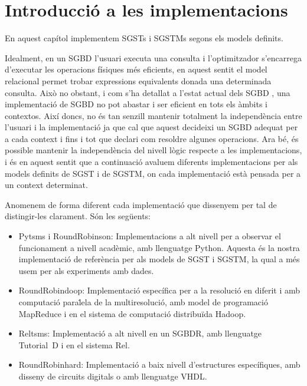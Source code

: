 

\chapter{Introducció a les implementacions}

En aquest capítol implementem \glspl{SGST} i \glspl{SGSTM} segons els
models definits.



Idealment, en un \gls{SGBD} l'usuari executa una consulta i
l'optimitzador s'encarrega d'executar les operacions físiques més
eficients, en aquest sentit el model relacional permet trobar
expressions equivalents donada una determinada consulta. Això no
obstant, i com s'ha detallat a l'estat actual dels \gls{SGBD}
, una implementació de \gls{SGBD} no pot abastar i ser
eficient en tots els àmbits i contextos. Així doncs, no és tan senzill
mantenir totalment la independència entre l'usuari i la implementació
ja que cal que aquest decideixi un \gls{SGBD} adequat per a cada
context i fins i tot que declari com resoldre algunes operacions.  Ara
bé, és possible mantenir la independència del nivell lògic respecte a
les implementacions, i és en aquest sentit que a continuació avaluem
diferents implementacions per als models definits de \gls{SGST} i de
\gls{SGSTM}, on cada implementació està pensada per a un context
determinat.


Anomenem de forma diferent cada implementació que dissenyem per tal de
distingir-les clarament. Són les següents:

\begin{itemize}
\item Pytsms i RoundRobinson: Implementacions a alt nivell per a
  observar el funcionament a nivell acadèmic, amb llenguatge
  Python. Aquesta és la nostra implementació de referència per als
  models de \gls{SGST} i \gls{SGSTM}, la qual a més usem per als
  experiments amb dades.

\item RoundRobindoop: Implementació específica per a la resolució en
  diferit i amb computació para\.lela de la multiresolució, amb model
  de programació MapReduce i en el sistema de computació distribuïda
  Hadoop.

\item Reltsms: Implementació a alt nivell en un \gls{SGBDR}, amb
  llenguatge Tutorial~D i en el sistema Rel.

\item RoundRobinhard: Implementació a baix nivell d'estructures
  específiques, amb disseny de circuits digitals o amb llenguatge
  VHDL.



\end{itemize}




